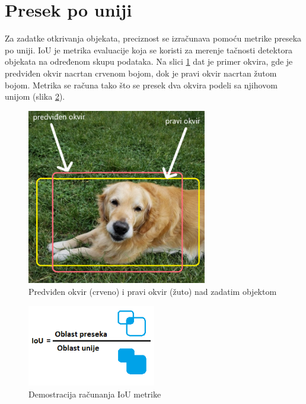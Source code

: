 \documentclass[12pt,oneside]{memoir}
\begin{document}
\section{Presek po uniji}
Za zadatke otkrivanja objekata, preciznost se izračunava pomoću metrike preseka po uniji. IoU je metrika evaluacije koja se koristi za merenje tačnosti detektora objekata na određenom skupu podataka. Na slici \ref{fig:section3_iou} dat je primer okvira, gde je predviđen okvir nacrtan crvenom bojom, dok je pravi okvir nacrtan žutom bojom. Metrika se računa tako što se presek dva okvira podeli sa njihovom unijom (slika \ref{fig:section3_iou_calc}).

\begin{figure}[!ht]
    \centering
    \includegraphics[width=0.7\textwidth]{matfmaster/glava3/iou_cus.png}
    \caption{Predviđen okvir (crveno) i pravi okvir (žuto) nad zadatim objektom}
    \label{fig:section3_iou}
\end{figure}

\begin{figure}[!ht]
    \centering
    \includegraphics[width=0.5\textwidth]{matfmaster/glava3/iou_calc_cus.png}
    \caption{Demostracija računanja IoU metrike}
    \label{fig:section3_iou_calc}
\end{figure}
\end{document}

